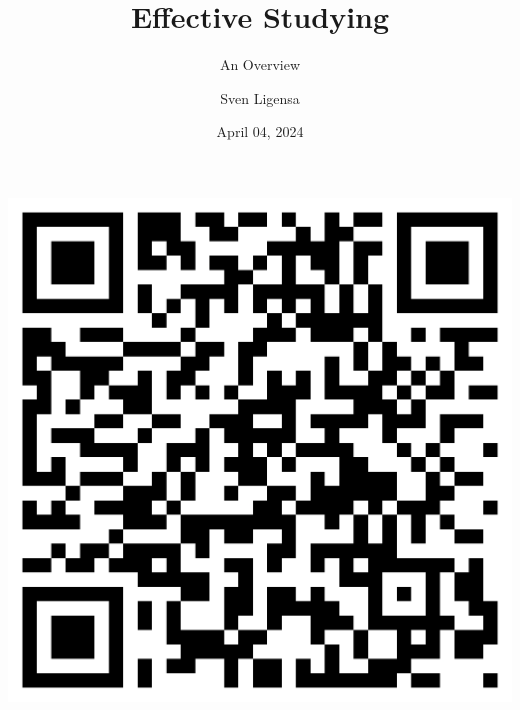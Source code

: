 \documentclass{ercisbeamer}
\title{Effective Studying}
\subtitle{An Overview}
\author{Sven Ligensa}
\institute{European Research Center for Information Systems (ERCIS)}
\date{April 04, 2024}
\begin{document}
\begin{frame}
    \begin{tbox}
        \titlepage
        \begin{minipage}[c]{.32\textwidth}
            \centering
        \end{minipage}%
        \begin{minipage}[c]{.32\textwidth}
            \includegraphics[height=.35\paperheight]{00_resources/qr_lw_course.png}
        \end{minipage}
    \end{tbox}
\end{frame}
\setbgimage{}
\end{document}
